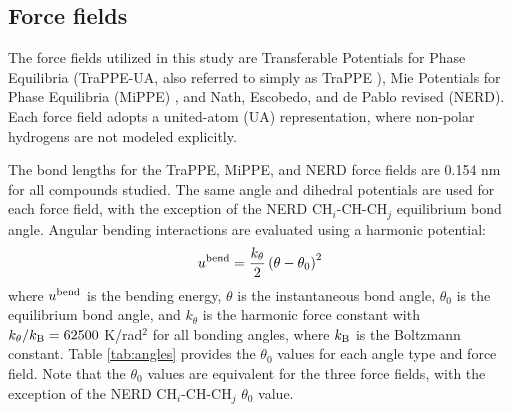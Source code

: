 \documentclass[journal=jced,manuscript=article]{achemso}
\begin{document}
\subsection{Force fields} \label{sec: Force fields}

    The force fields utilized in this study are Transferable Potentials for Phase Equilibria (TraPPE-UA, also referred to simply as TraPPE \cite{TraPPE,Martin1999,TraPPEUA2}), Mie Potentials for Phase Equilibria (MiPPE) \cite{Mie,Potoff_branched}, and Nath, Escobedo, and de Pablo revised (NERD). Each force field adopts a united-atom (UA) representation, where non-polar hydrogens are not modeled explicitly. 
    
    
    The bond lengths for the TraPPE, MiPPE, and NERD force fields are 0.154 nm for all compounds studied. The same angle and dihedral potentials are used for each force field, with the exception of the NERD CH$_i$-CH-CH$_j$ equilibrium bond angle. Angular bending interactions are evaluated using a harmonic potential:
    \begin{equation}
    u^{\rm bend} = \frac{k_\theta}{2} \left(\theta-\theta_0\right)^2
    \end{equation}
    where $u^{\rm bend}$ is the bending energy, $\theta$ is the instantaneous bond angle, $\theta_0$ is the equilibrium bond angle, and $k_\theta$ is the harmonic force constant with $k_\theta/k_{\rm B} = 62500$ K/rad$^2$ for all bonding angles, where $k_{\rm B}$ is the Boltzmann constant. Table \ref{tab:angles} provides the $\theta_0$ values for each angle type and force field. Note that the $\theta_0$ values are equivalent for the three force fields, with the exception of the NERD CH$_i$-CH-CH$_j$ $\theta_0$ value. 
    
\end{document}

